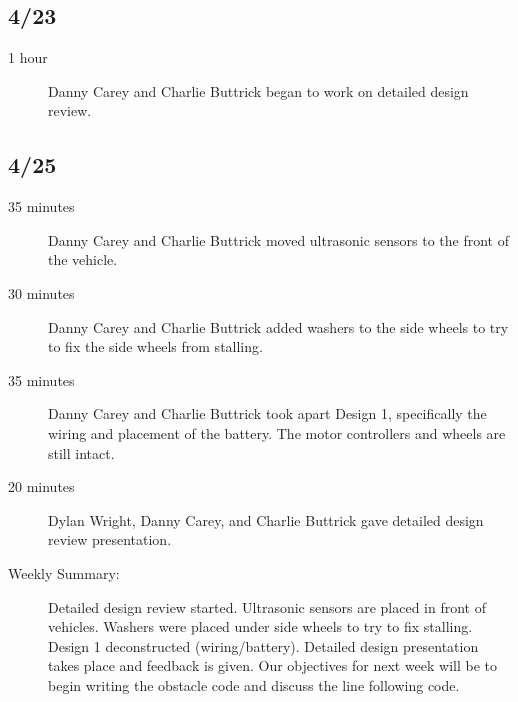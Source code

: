 \documentclass[11pt]{report}
\begin{document}
\begin{adjustwidth}{0.5cm}{0cm}
\subsection*{4/23}
\begin{greylineformat}
\begin{description}
    \item [1 hour] Danny Carey and Charlie Buttrick began to work on detailed design review. 
\end{description}\end{greylineformat}

\vspace{-2.1em}\subsection*{4/25}
\begin{greylineformat}
\begin{description}
    \item [35 minutes] Danny Carey and Charlie Buttrick moved ultrasonic sensors to the front of the vehicle. 
    \item [30 minutes] Danny Carey and Charlie Buttrick added washers to the side wheels to try to fix the side wheels from stalling. 
    \item [35 minutes] Danny Carey and Charlie Buttrick took apart Design 1, specifically the wiring and placement of the battery. The motor controllers and wheels are still intact. 
    \item [20 minutes] Dylan Wright, Danny Carey, and Charlie Buttrick gave detailed design review presentation.
\end{description}\end{greylineformat}

\begin{description}
    \item [Weekly Summary:] Detailed design review started. Ultrasonic sensors are placed in front of vehicles. Washers were placed under side wheels to try to fix stalling. Design 1 deconstructed (wiring/battery). Detailed design presentation takes place and feedback is given. Our objectives for next week will be to begin writing the obstacle code and discuss the line following code.
\end{description}\vspace{0.5em}
\end{adjustwidth}
\end{document}
